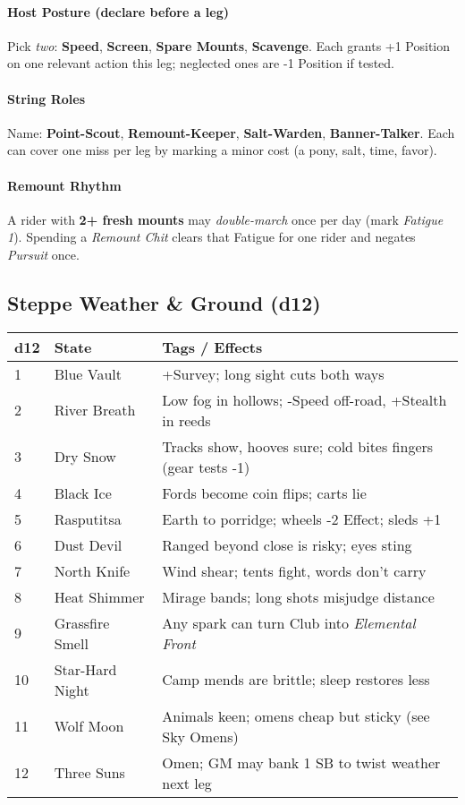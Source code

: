 \paragraph{Host Posture (declare before a leg)}
Pick \emph{two}: \textbf{Speed}, \textbf{Screen}, \textbf{Spare Mounts}, \textbf{Scavenge}.  
Each grants +1 Position on one relevant action this leg; neglected ones are -1 Position if tested.

\paragraph{String Roles}
Name: \textbf{Point-Scout}, \textbf{Remount-Keeper}, \textbf{Salt-Warden}, \textbf{Banner-Talker}.  
Each can cover one miss per leg by marking a minor cost (a pony, salt, time, favor).

\paragraph{Remount Rhythm}
A rider with \textbf{2+ fresh mounts} may \emph{double-march} once per day (mark \emph{Fatigue 1}).  
Spending a \emph{Remount Chit} clears that Fatigue for one rider and negates \emph{Pursuit} once.
\subsection*{Steppe Weather \& Ground (d12)}

\begin{tabular}{p{} p{} p{}}
\textbf{d12} & \textbf{State} & \textbf{Tags / Effects} \\
\hline
1 & Blue Vault & +Survey; long sight cuts both ways \\
2 & River Breath & Low fog in hollows; -Speed off-road, +Stealth in reeds \\
3 & Dry Snow & Tracks show, hooves sure; cold bites fingers (gear tests -1) \\
4 & Black Ice & Fords become coin flips; carts lie \\
5 & Rasputitsa & Earth to porridge; wheels -2 Effect; sleds +1 \\
6 & Dust Devil & Ranged beyond close is risky; eyes sting \\
7 & North Knife & Wind shear; tents fight, words don’t carry \\
8 & Heat Shimmer & Mirage bands; long shots misjudge distance \\
9 & Grassfire Smell & Any spark can turn Club into \emph{Elemental Front} \\
10 & Star-Hard Night & Camp mends are brittle; sleep restores less \\
11 & Wolf Moon & Animals keen; omens cheap but sticky (see Sky Omens) \\
12 & Three Suns & Omen; GM may bank 1 SB to twist weather next leg \\
\end{tabular}
